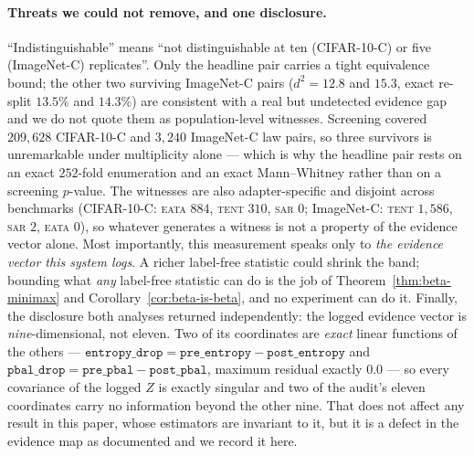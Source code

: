 \paragraph{Threats we could not remove, and one disclosure.} ``Indistinguishable'' means ``not
distinguishable at ten (CIFAR-10-C) or five (ImageNet-C) replicates''. Only the headline pair
carries a tight equivalence bound; the other two surviving ImageNet-C pairs ($d^2=12.8$ and $15.3$,
exact re-split $13.5\%$ and $14.3\%$) are consistent with a real but undetected evidence gap and we
do not quote them as population-level witnesses. Screening covered $209{,}628$ CIFAR-10-C and
$3{,}240$ ImageNet-C law pairs, so three survivors is unremarkable under multiplicity alone --- which
is why the headline pair rests on an exact $252$-fold enumeration and an exact Mann--Whitney rather
than on a screening $p$-value. The witnesses are also adapter-specific and disjoint across
benchmarks (CIFAR-10-C: \textsc{eata} $884$, \textsc{tent} $310$, \textsc{sar} $0$; ImageNet-C:
\textsc{tent} $1{,}586$, \textsc{sar} $2$, \textsc{eata} $0$), so whatever generates a witness is
not a property of the evidence vector alone. Most importantly, this measurement speaks only to
\emph{the evidence vector this system logs}. A richer label-free statistic could shrink the band;
bounding what \emph{any} label-free statistic can do is the job of Theorem~\ref{thm:beta-minimax}
and Corollary~\ref{cor:beta-is-beta}, and no experiment can do it. Finally, the disclosure both
analyses returned independently: the logged evidence vector is \emph{nine}-dimensional, not eleven.
Two of its coordinates are \emph{exact} linear functions of the others ---
$\texttt{entropy\_drop}=\texttt{pre\_entropy}-\texttt{post\_entropy}$ and
$\texttt{pbal\_drop}=\texttt{pre\_pbal}-\texttt{post\_pbal}$, maximum residual exactly $0.0$ --- so
every covariance of the logged $Z$ is exactly singular and two of the audit's eleven coordinates
carry no information beyond the other nine. That does not affect any result in this paper, whose
estimators are invariant to it, but it is a defect in the evidence map as documented and we record
it here.
